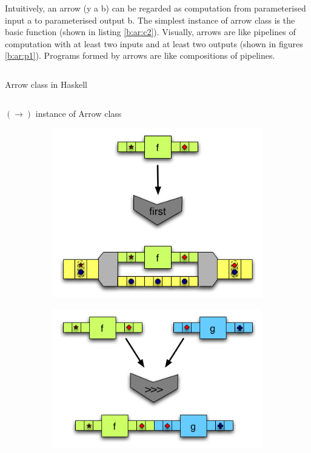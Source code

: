 Intuitively, an arrow (y a b) can be regarded as computation from parameterised input a to parameterised output b. The simplest instance of arrow class is the basic function (shown in listing \ref{b:ar:c2}). Visually, arrows are like pipelines of computation with at least two inputs and at least two outputs (shown in figures \ref{b:ar:p1}\cite{HaskellUnderstandingArrows}). Programs formed by arrows are like compositions of pipelines.
\begin{code}
  \inputminted{haskell}{background/ar-def.hs}
  \caption{Arrow class in Haskell}
  \label{b:ar:c1}
\end{code}
\begin{code}
  \inputminted{haskell}{background/ar-func.hs}
  \caption{$(\rightarrow)$ instance of Arrow class} 
  \label{b:ar:c2}
\end{code}
\begin{figure}
  \centering
  \begin{subfigure}[b]{0.475\textwidth}
      \centering
      \includegraphics[width=\textwidth]{background/image/ArrowsConveyors_first2.png}
      \label{fig:mean and std of net14}
  \end{subfigure}
  \hfill
  \begin{subfigure}[b]{0.475\textwidth}  
      \centering 
      \includegraphics[width=\textwidth]{background/image/ArrowsConveyors_bind2.png}

\end{subfigure}
\end{figure}
